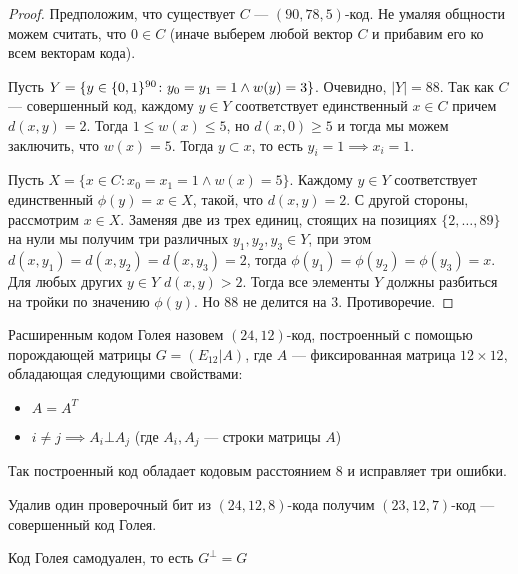 \begin{proof}
Предположим, что существует $C$ --- $(90,78,5)$-код. Не умаляя общности 
можем считать, что $0 \in C$ (иначе выберем любой вектор $C$ и прибавим его
ко всем векторам кода). 

Пусть $Y = \{y \in \{0,1\}^{90} \colon y_0 = y_1 = 1 \land w(y) = 3 \}$. Очевидно,
$|Y| = 88$. Так как $C$ --- совершенный код, каждому $y \in Y$ соответствует
единственный $x \in C$ причем $d(x,y) = 2$. Тогда $1 \le w(x) \le 5$, но
$d(x,0) \ge 5$ и тогда мы можем заключить, что $w(x) = 5$. Тогда $y \subset x$,
то есть $y_i = 1 \implies x_i = 1$.

Пусть $X = \{x \in C \colon x_0 = x_1 = 1 \land w(x) = 5\}$. Каждому $y \in Y$ 
соответствует единственный $\phi(y) = x \in X$, такой, что $d(x,y) = 2$. С другой стороны,
рассмотрим $x\in X$. Заменяя две из трех единиц, стоящих на позициях 
$\{2, \ldots, 89\}$ на нули мы получим три различных $y_1, y_2, y_3 \in Y$,
при этом $d(x, y_1) = d(x, y_2) = d(x, y_3) = 2$, тогда 
$\phi(y_1) = \phi(y_2) = \phi(y_3) = x$. Для любых других $y \in Y$ 
$d(x,y) > 2$. Тогда все элементы $Y$ должны разбиться на тройки по значению
$\phi(y)$. Но $88$ не делится на $3$. Противоречие.
\end{proof}
\newpage
\begin{definition}
Расширенным кодом Голея назовем $(24,12)$-код, построенный с помощью 
порождающей матрицы $G = (E_{12} | A)$, где $A$ --- фиксированная матрица
$12 \times 12$, обладающая следующими свойствами:
\begin{itemize}
\item $A = A^{T}$
\item $i \neq j \implies A_i \bot A_j$ (где $A_i, A_j$ --- строки матрицы $A$)
\end{itemize}

\end{definition}

\begin{proposition}
Так построенный код обладает кодовым расстоянием $8$ и исправляет три ошибки.
\end{proposition}

\begin{remark}
Удалив один проверочный бит из $(24,12,8)$-кода получим $(23,12,7)$-код ---
совершенный код Голея.
\end{remark}

\begin{proposition}
Код Голея самодуален, то есть $G^{\bot} = G$
\end{proposition}

